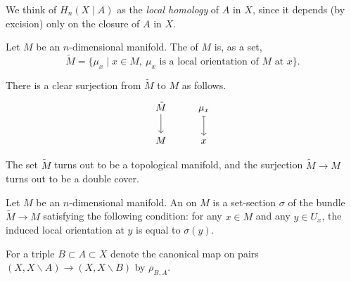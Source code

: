 \documentclass[main.tex]{subfiles}
\begin{document}
We think of \(H_{n}(X \mid A)\) as the \emph{local homology} of \(A\) in \(X\), since it depends (by excision) only on the closure of \(A\) in \(X\).

\begin{definition}
  \label{def:orientation_cover}
  Let \(M\) be an \(n\)-dimensional manifold. The  of \(M\) is, as a set,
  \begin{equation*}
    \tilde{M} = \{\mu_{x} \mid x \in M,\ \mu_{x} \text{ is a local orientation of }M \text{ at }x\}.
  \end{equation*}
\end{definition}

There is a clear surjection from \(\tilde{M}\) to \(M\) as follows.
\begin{equation*}
  \begin{tikzcd}
    \tilde{M}
    \arrow[d]
    & \mu_{x}
    \arrow[d, mapsto]
    \\
    M
    & x
  \end{tikzcd}
\end{equation*}

The set \(\tilde{M}\) turns out to be a topological manifold, and the surjection \(\tilde{M} \to M\) turns out to be a double cover.

\begin{definition}[orientation]
  \label{def:orientation}
  Let \(M\) be an \(n\)-dimensional manifold. An  on \(M\) is a set-section \(\sigma\) of the bundle \(\tilde{M} \to M\) satisfying the following condition: for any \(x \in M\) and any \(y \in U_{x}\), the induced local orientation at \(y\) is equal to \(\sigma(y)\).
\end{definition}

For a triple \(B \subset A \subset X\) denote the canonical map on pairs \((X, X\smallsetminus A) \to (X, X\smallsetminus B)\) by \(\rho_{B, A}\).
\end{document}
